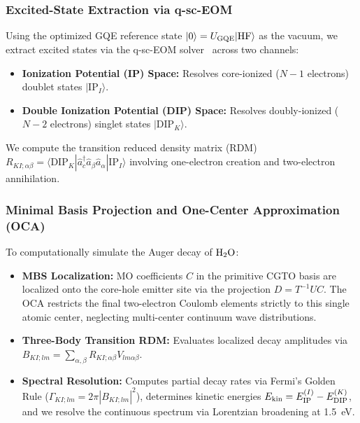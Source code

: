 \documentclass[11pt]{article}
\begin{document}
\subsubsection{Excited-State Extraction via q-sc-EOM}
Using the optimized GQE reference state $|0\rangle = U_{\rm GQE}|{\rm HF}\rangle$ as the vacuum, we extract excited states via the q-sc-EOM solver~\cite{qsceom} across two channels:
\begin{itemize}[leftmargin=*,noitemsep,topsep=0pt]
  \item \textbf{Ionization Potential (IP) Space:} Resolves core-ionized ($N-1$ electrons) doublet states $|\text{IP}_I\rangle$.
  \item \textbf{Double Ionization Potential (DIP) Space:} Resolves doubly-ionized ($N-2$ electrons) singlet states $|\text{DIP}_K\rangle$.
\end{itemize}
We compute the transition reduced density matrix (RDM) $R_{KI;\alpha\beta} = \langle \text{DIP}_K |\hat{a}_{c}^{\dagger}\hat{a}_{\beta}\hat{a}_{\alpha}| \text{IP}_I \rangle$ involving one-electron creation and two-electron annihilation.

\subsubsection{Minimal Basis Projection and One-Center Approximation (OCA)}
To computationally simulate the Auger decay of $\rm H_2O$:
\begin{itemize}[leftmargin=*,noitemsep,topsep=0pt]
  \item \textbf{MBS Localization:} MO coefficients $C$ in the primitive CGTO basis are localized onto the core-hole emitter site via the projection $D = T^{-1} U C$. The OCA restricts the final two-electron Coulomb elements strictly to this single atomic center, neglecting multi-center continuum wave distributions.
  \item \textbf{Three-Body Transition RDM:} Evaluates localized decay amplitudes via $B_{KI;lm} = \sum_{\alpha,\beta} R_{KI;\alpha\beta} V_{lm\alpha\beta}$.
  \item \textbf{Spectral Resolution:} Computes partial decay rates via Fermi's Golden Rule ($\Gamma_{KI;lm} = 2\pi |B_{KI;lm}|^2$), determines kinetic energies $E_{\rm kin} = E_{\rm IP}^{(I)} - E_{\rm DIP}^{(K)}$, and we resolve the continuous spectrum via Lorentzian broadening at 1.5~eV.
\end{itemize}
\end{document}

